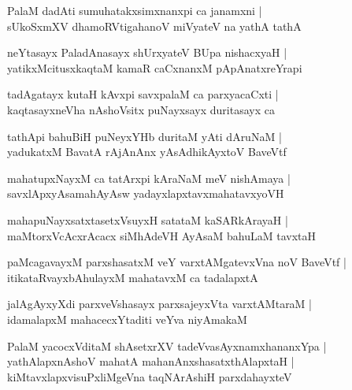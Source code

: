 \documentclass[twoside,12pt,openright]{book}
\newcounter{shloka}[chapter]
\begin{document}
\begin{shloka}%
PalaM dadAti sumuhatakxsimxnanxpi  ca janamxni |\\
sUkoSxmXV dhamoRVtigahanoV miVyateV na yathA tathA 
\end{shloka}

\begin{shloka}%
neYtasayx PaladAnasayx shUrxyateV BUpa nishacxyaH |\\
yatikxMcitusxkaqtaM kamaR caCxnanxM pApAnatxreYrapi
\end{shloka}

\begin{shloka}%
tadAgatayx kutaH kAvxpi savxpalaM ca parxyacaCxti |\\
kaqtasayxneVha nAshoVsitx puNayxsayx duritasayx ca 
\end{shloka}

\begin{shloka}%
tathApi bahuBiH puNeyxYHb duritaM yAti dAruNaM |\\
yadukatxM BavatA rAjAnAnx yAsAdhikAyxtoV BaveVtf 
\end{shloka}

\begin{shloka}%
mahatupxNayxM ca tatArxpi kAraNaM meV nishAmaya |\\
savxlApxyAsamahAyAsw yadayxlapxtavxmahatavxyoVH 
\end{shloka}

\begin{shloka}%
mahapuNayxsatxtasetxVsuyxH satataM kaSARkArayaH |\\
maMtorxVcAcxrAcacx siMhAdeVH AyAsaM bahuLaM tavxtaH 
\end{shloka}

\begin{shloka}%
paMcagavayxM parxshasatxM veY varxtAMgatevxVna noV BaveVtf |\\
itikataRvayxbAhulayxM mahatavxM ca tadalapxtA
\end{shloka}

\begin{shloka}%
jalAgAyxyXdi parxveVshasayx parxsajeyxVta varxtAMtaraM |\\
idamalapxM mahacecxYtaditi veYva niyAmakaM 
\end{shloka}

\begin{shloka}%
PalaM yacocxVditaM shAsetxrXV tadeVvasAyxnamxhananxYpa |\\
yathAlapxnAshoV mahatA mahanAnxshasatxthAlapxtaH |\\
kiMtavxlapxvisuPxliMgeVna taqNArAshiH parxdahayxteV 
\end{shloka}
\end{document}
